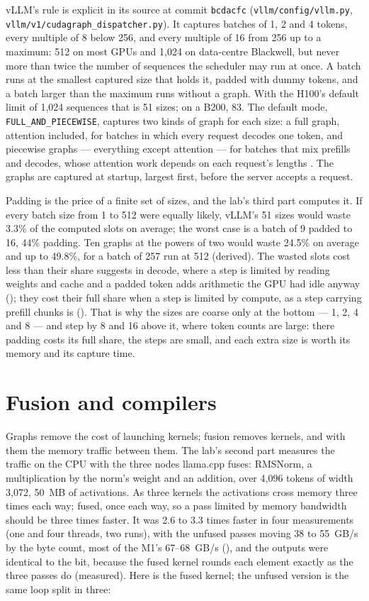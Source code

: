 vLLM's rule is explicit in its source at commit \texttt{bcdacfc}
(\texttt{vllm/config/vllm.py}, \texttt{vllm/v1/cudagraph\_dispatcher.py}). It
captures batches of 1, 2 and 4 tokens, every multiple of 8 below 256, and every
multiple of 16 from 256 up to a maximum: 512 on most GPUs and 1,024 on
data-centre Blackwell, but never more than twice the number of sequences the
scheduler may run at once. A batch runs at the smallest captured size that
holds it, padded with dummy tokens, and a batch larger than the maximum runs
without a graph. With the H100's default limit of 1,024 sequences that is 51
sizes; on a B200, 83. The default mode, \texttt{FULL\_AND\_PIECEWISE}, captures
two kinds of graph for each size: a full graph, attention included, for batches
in which every request decodes one token, and piecewise graphs --- everything
except attention --- for batches that mix prefills and decodes, whose attention
work depends on each request's lengths \cite{vllm2026cudagraphs}. The graphs
are captured at startup, largest first, before the server accepts a request.

Padding is the price of a finite set of sizes, and the lab's third part
computes it. If every batch size from 1 to 512 were equally likely, vLLM's 51
sizes would waste 3.3\% of the computed slots on average; the worst case is a
batch of 9 padded to 16, 44\% padding. Ten graphs at the powers of two would
waste 24.5\% on average and up to 49.8\%, for a batch of 257 run at 512
(derived). The wasted slots cost less than their share suggests in decode,
where a step is limited by reading weights and cache and a padded token adds
arithmetic the GPU had idle anyway (); they cost their full
share when a step is limited by compute, as a step carrying prefill chunks is
(). That is why the sizes are coarse only at the bottom
--- 1, 2, 4 and 8 --- and step by 8 and 16 above it, where token counts are
large: there padding costs its full share, the steps are small, and each extra
size is worth its memory and its capture time.

\section{Fusion and compilers}

Graphs remove the cost of launching kernels; fusion removes kernels, and with
them the memory traffic between them. The lab's second part measures the
traffic on the CPU with the three nodes llama.cpp fuses: RMSNorm, a
multiplication by the norm's weight and an addition, over 4,096 tokens of
width 3,072, 50~MB of activations. As three kernels the activations cross
memory three times each way; fused, once each way, so a pass limited by memory
bandwidth should be three times faster. It was 2.6 to 3.3 times faster in four
measurements (one and four threads, two runs), with the unfused passes moving
38 to 55~GB/s by the byte count, most of the M1's 67--68~GB/s
(), and the outputs were identical to the bit, because the fused kernel rounds each
element exactly as the three passes do (measured). Here is the fused kernel;
the unfused version is the same loop split in three:

